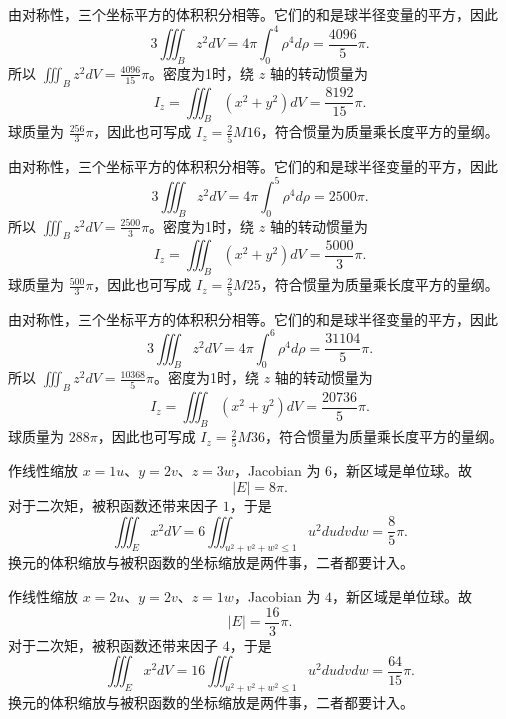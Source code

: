 \documentclass[UTF8,12pt,a4paper,fontset=fandol]{ctexart}
\begin{document}
\begin{solve}\label{ans:c39q10}
由对称性，三个坐标平方的体积积分相等。它们的和是球半径变量的平方，因此
\[
3\iiint_Bz^2dV=4\pi\int_0^{4}\rho^4d\rho=\frac{4096}{5}\pi.
\]
所以 $\iiint_Bz^2dV=\frac{4096}{15}\pi$。密度为1时，绕 $z$ 轴的转动惯量为
\[
I_z=\iiint_B(x^2+y^2)dV=\frac{8192}{15}\pi.
\]
球质量为 $\frac{256}{3}\pi$，因此也可写成 $I_z=\frac25M16$，符合惯量为质量乘长度平方的量纲。
\end{solve}

\begin{solve}\label{ans:c39q11}
由对称性，三个坐标平方的体积积分相等。它们的和是球半径变量的平方，因此
\[
3\iiint_Bz^2dV=4\pi\int_0^{5}\rho^4d\rho=2500\pi.
\]
所以 $\iiint_Bz^2dV=\frac{2500}{3}\pi$。密度为1时，绕 $z$ 轴的转动惯量为
\[
I_z=\iiint_B(x^2+y^2)dV=\frac{5000}{3}\pi.
\]
球质量为 $\frac{500}{3}\pi$，因此也可写成 $I_z=\frac25M25$，符合惯量为质量乘长度平方的量纲。
\end{solve}

\begin{solve}\label{ans:c39q12}
由对称性，三个坐标平方的体积积分相等。它们的和是球半径变量的平方，因此
\[
3\iiint_Bz^2dV=4\pi\int_0^{6}\rho^4d\rho=\frac{31104}{5}\pi.
\]
所以 $\iiint_Bz^2dV=\frac{10368}{5}\pi$。密度为1时，绕 $z$ 轴的转动惯量为
\[
I_z=\iiint_B(x^2+y^2)dV=\frac{20736}{5}\pi.
\]
球质量为 $288\pi$，因此也可写成 $I_z=\frac25M36$，符合惯量为质量乘长度平方的量纲。
\end{solve}

\begin{solve}\label{ans:c39q13}
作线性缩放 $x=1u$、$y=2v$、$z=3w$，Jacobian 为 $6$，新区域是单位球。故
\[
|E|=8\pi.
\]
对于二次矩，被积函数还带来因子 $1$，于是
\[
\iiint_Ex^2dV=6\iiint_{u^2+v^2+w^2\le1}u^2dudvdw=\frac{8}{5}\pi.
\]
换元的体积缩放与被积函数的坐标缩放是两件事，二者都要计入。
\end{solve}

\begin{solve}\label{ans:c39q14}
作线性缩放 $x=2u$、$y=2v$、$z=1w$，Jacobian 为 $4$，新区域是单位球。故
\[
|E|=\frac{16}{3}\pi.
\]
对于二次矩，被积函数还带来因子 $4$，于是
\[
\iiint_Ex^2dV=16\iiint_{u^2+v^2+w^2\le1}u^2dudvdw=\frac{64}{15}\pi.
\]
换元的体积缩放与被积函数的坐标缩放是两件事，二者都要计入。
\end{solve}
\end{document}
